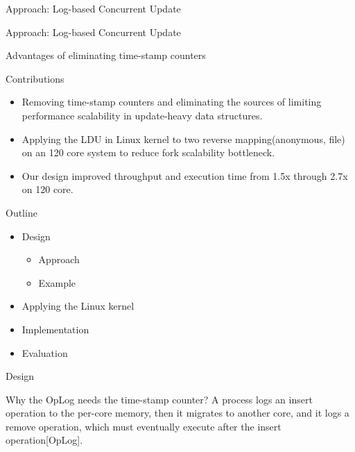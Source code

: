 \documentclass[english]{beamer} %
\begin{document}
\begin{frame}{Approach: Log-based Concurrent Update}
\end{frame}


\begin{frame}{Approach: Log-based Concurrent Update}
\end{frame}


\begin{frame}{Advantages of eliminating time-stamp counters}
\end{frame}


\begin{frame}{Contributions}
    \begin{itemize}[<+-| alert@+>]
	\item Removing time-stamp counters and eliminating the sources of limiting
	performance scalability in update-heavy data structures.
	\item  Applying the LDU in Linux kernel to two reverse mapping(anonymous, file)
	on an 120 core system to reduce fork scalability bottleneck.
	\item Our design improved throughput and execution time from 1.5x through 2.7x
	on 120 core.
	\end{itemize}
\end{frame}


\begin{frame}{Outline}
	\begin{itemize}
	\item Design
	\begin{itemize}
	\item Approach
	\item Example 
	\end{itemize}
	\item Applying the Linux kernel
	\item Implementation
	\item Evaluation
	\end{itemize}
\end{frame}


\begin{frame}{Design}
\end{frame}



\begin{frame}{Why the OpLog needs the time-stamp counter?}
A process logs an insert operation to the per-core memory, then
it migrates to another core, and it logs a remove operation, which must
eventually execute after the insert operation[OpLog].
\end{frame}
\end{document}
